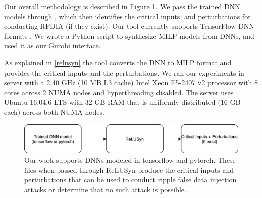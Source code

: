 Our overall methodology is described in Figure \ref{fig:methodology-2}. 
We pass the trained \ac{DNN} models through \tool, which then identifies the critical inputs, and perturbations for conducting \ac{RFDIA} (if they exist). 
Our tool currently supports TensorFlow \ac{DNN} formats  \cite{TensorFlow}. 
We wrote a Python script to synthesize \ac{MILP} models from \ac{DNN}s, and used it as our Gurobi interface. 

As explained in \ref{relusyn} the tool converts the \ac{DNN} to \ac{MILP} format and provides the critical inputs and the perturbations. 
We ran our experiments in server with a 2.40 GHz (10 MB L3 cache) Intel Xeon E5-2407 v2 processor
with 8 cores across 2 NUMA nodes and hyperthreading disabled. The server uses Ubuntu 16.04.6 LTS with 32 GB RAM that
is uniformly distributed (16 GB each) across both NUMA nodes.



 

\begin{figure}
	\centering
	\includegraphics[width=0.7\linewidth]{"Images/Methodology2"}
	\caption[Methodology]{Our work supports DNNs modeled in tensorflow and pytorch. These files when passed through ReLUSyn produce the critical inputs and perturbations that can be used to conduct ripple false data injection attacks or determine that no such attack is possible.}
	\label{fig:methodology-2}
\end{figure}



